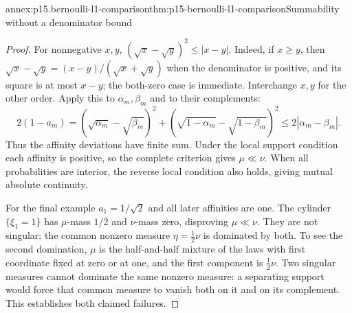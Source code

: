 \begin{annexitem}{annex:p15.bernoulli-l1-comparison}{thm:p15-bernoulli-l1-comparison}{Summability without a denominator bound}
\begin{proof}
For nonnegative \(x,y\),
\((\sqrt x-\sqrt y)^2\leq|x-y|\).
Indeed, if \(x\geq y\), then
\(\sqrt x-\sqrt y=(x-y)/(\sqrt x+\sqrt y)\) when the denominator
is positive, and its square is at most \(x-y\); the both-zero
case is immediate. Interchange \(x,y\) for the other order.
Apply this to \(\alpha_m,\beta_m\) and to their complements:
\[
 2(1-a_m)
   =(\sqrt{\alpha_m}-\sqrt{\beta_m})^2
    +(\sqrt{1-\alpha_m}-\sqrt{1-\beta_m})^2
                       \leq2|\alpha_m-\beta_m|.
\]
Thus the affinity deviations have finite sum.
Under the local support condition each affinity is positive,
so the complete criterion gives \(\mu\ll\nu\).
When all probabilities are interior, the reverse local condition
also holds, giving mutual absolute continuity.

For the final example \(a_1=1/\sqrt2\) and all later affinities
are one. The cylinder \(\{\xi_1=1\}\) has \(\mu\)-mass \(1/2\)
and \(\nu\)-mass zero, disproving \(\mu\ll\nu\).
They are not singular: the common nonzero measure
\(\eta=\tfrac12\nu\) is dominated by both.
To see the second domination, \(\mu\) is the half-and-half mixture
of the laws with first coordinate fixed at zero or at one, and the
first component is \(\tfrac12\nu\).
Two singular measures cannot dominate the same nonzero measure:
a separating support would force that common measure to vanish
both on it and on its complement.
This establishes both claimed failures.
\end{proof}
\end{annexitem}
